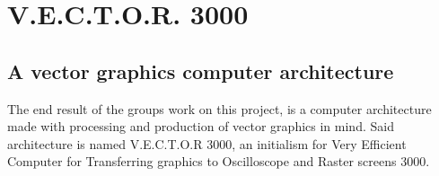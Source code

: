 \chapter{V.E.C.T.O.R. 3000}

\section{A vector graphics computer architecture}

The end result of the groups work on this project, is a computer architecture made with processing and production of vector graphics in mind.
Said architecture is named V.E.C.T.O.R 3000, an initialism for Very Efficient Computer for Transferring graphics to Oscilloscope and Raster screens 3000.
